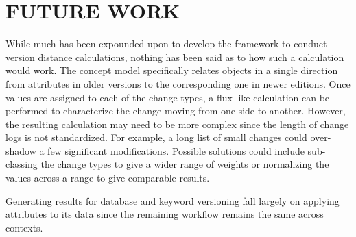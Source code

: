 
\chapter{FUTURE WORK}


While much has been expounded upon to develop the framework to conduct version distance calculations, nothing has been said as to how such a calculation would work.
The concept model specifically relates objects in a single direction from attributes in older versions to the corresponding one in newer editions.
Once values are assigned to each of the change types, a flux-like calculation can be performed to characterize the change moving from one side to another.
However, the resulting calculation may need to be more complex since the length of change logs is not standardized.
For example, a long list of small changes could over-shadow a few significant modifications.
Possible solutions could include sub-classing the change types to give a wider range of weights or normalizing the values across a range to give comparable results.

Generating results for database and keyword versioning fall largely on applying attributes to its data since the remaining workflow remains the same across contexts.